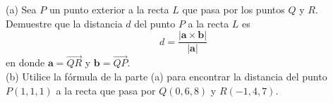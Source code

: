 \item (a) Sea $P$ un punto exterior a la recta $L$ que pasa por los puntos $Q$ y $R$. Demuestre que la distancia $d$ del punto $P$ a la recta $L$ es
    \[
    d = \frac{|\mathbf{a} \times \mathbf{b}|}{|\mathbf{a}|}
    \]
    en donde $\mathbf{a} = \overrightarrow{QR}$ y $\mathbf{b} = \overrightarrow{QP}$. \\
    (b) Utilice la fórmula de la parte (a) para encontrar la distancia del punto $P(1, 1, 1)$ a la recta que pasa por $Q(0, 6, 8)$ y $R(-1, 4, 7)$.
